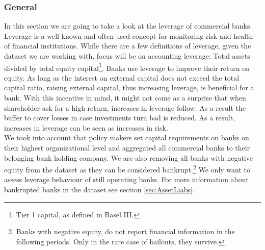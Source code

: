 \documentclass[12pt, a4paper]{article} %
\begin{document}
\subsubsection{General}

In this section we are going to take a look at the leverage of commercial banks. Leverage is a well known and often used concept for monitoring risk and health of financial institutions. While there are a few definitions of leverage, given the dataset we are working with, focus will be on accounting leverage: Total assets divided by total equity capital\footnote{Tier 1 capital, as defined in Basel III.}. Banks use leverage to improve their return on equity. As long as the interest on external capital does not exceed the total capital ratio, raising external capital, thus increasing leverage, is beneficial for a bank. With this incentive in mind, it might not come as a surprise that when shareholder ask for a high return, increases in leverage follow. As a result the buffer to cover losses in case investments turn bad is reduced. As a result, increases in leverage can be seen as increases in risk.\\
We took into account that policy makers set capital requirements on banks on their highest organizational level and aggregated all commercial banks to their belonging bank holding company. 
We are also removing all banks with negative equity from the dataset as they can be considered bankrupt.\footnote{Banks with negative equity, do not report financial information in the following periods. Only in the rare case of bailouts, they survive.} We only want to assess leverage behaviour of still operating banks. For more information about bankrupted banks in the dataset see section \ref{sec:AssetLiabs}. 
\end{document}
